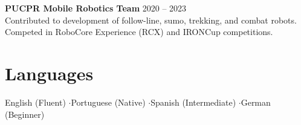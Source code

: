 \documentclass[11pt,a4paper]{article}
\begin{document}
\vspace{3pt}

\textbf{PUCPR Mobile Robotics Team} \hfill 2020 -- 2023 \\
Contributed to development of follow-line, sumo, trekking, and combat robots. Competed in RoboCore Experience (RCX) and IRONCup competitions.

\section{Languages}

\noindent English (Fluent) \enspace$\cdot$\enspace Portuguese (Native) \enspace$\cdot$\enspace Spanish (Intermediate) \enspace$\cdot$\enspace German (Beginner)
\end{document}
